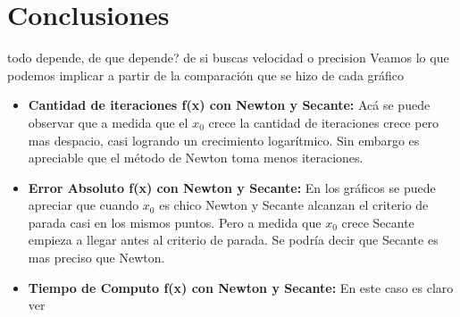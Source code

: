 \section{Conclusiones}
todo depende, de que depende? de si buscas velocidad o precision
Veamos lo que podemos implicar a partir de la comparación que se hizo de cada gráfico
\begin{itemize}
\item {\bf Cantidad de iteraciones f(x) con Newton y Secante:} Acá se puede observar que a medida que el $x_0$ crece la cantidad de iteraciones crece pero mas despacio, casi logrando un crecimiento logarítmico. Sin embargo es apreciable que el método de Newton toma menos iteraciones.
\item {\bf Error Absoluto f(x) con Newton y Secante:} En los gráficos se puede apreciar que cuando $x_0$ es chico Newton y Secante alcanzan el criterio de parada casi en los mismos puntos. Pero a medida que $x_0$ crece Secante empieza a llegar antes al criterio de parada. Se podría decir que Secante es mas preciso que Newton.
\item {\bf Tiempo de Computo f(x) con Newton y Secante:} En este caso es claro ver  

\end{itemize}



